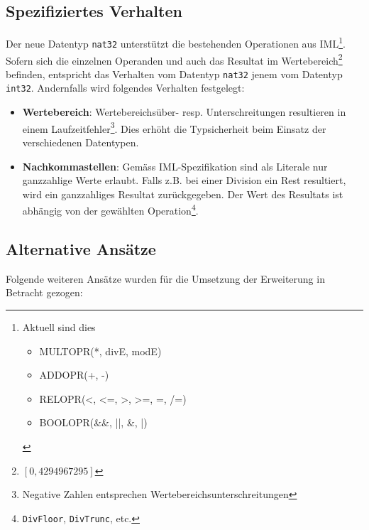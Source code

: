 \documentclass[10pt, a4paper, twocolumn]{article} %
\begin{document}
\subsection{Spezifiziertes Verhalten}
Der neue Datentyp \texttt{nat32} unterstützt die bestehenden Operationen aus IML\footnote{Aktuell sind dies \begin{itemize}
                                                                                                                \item MULTOPR(*, divE, modE) \item ADDOPR(+, -) \item RELOPR(<, <=, >, >=, =, /=) \item BOOLOPR(\&\&, ||, \&, |)
\end{itemize}}.
Sofern sich die einzelnen Operanden und auch das Resultat im Wertebereich\footnote{$[0,4294967295]$} befinden,
entspricht das Verhalten vom Datentyp \texttt{nat32} jenem vom Datentyp \texttt{int32}.
Andernfalls wird folgendes Verhalten festgelegt:

\begin{itemize}
    \item \textbf{Wertebereich}: Wertebereichsüber- resp. Unterschreitungen resultieren in einem Laufzeitfehler\footnote{Negative Zahlen entsprechen Wertebereichsunterschreitungen}. Dies erhöht die Typsicherheit beim Einsatz der verschiedenen Datentypen.
    \item \textbf{Nachkommastellen}: Gemäss IML-Spezifikation sind als Literale nur ganzzahlige Werte erlaubt. Falls z.B. bei einer Division ein Rest resultiert, wird ein ganzzahliges Resultat zurückgegeben. Der Wert des Resultats ist abhängig von der gewählten Operation\footnote{\texttt{DivFloor}, \texttt{DivTrunc}, etc.}.
\end{itemize}

\subsection{Alternative Ansätze}
Folgende weiteren Ansätze wurden für die Umsetzung der Erweiterung in Betracht gezogen:
\end{document}
